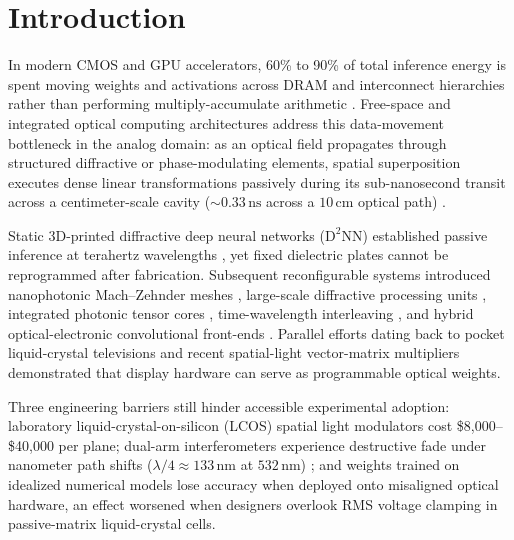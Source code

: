 \documentclass[journal]{IEEEtran}
\begin{document}
\section{Introduction}

In modern CMOS and GPU accelerators, 60\% to 90\% of total inference energy is spent moving weights and activations across DRAM and interconnect hierarchies rather than performing multiply-accumulate arithmetic \cite{horowitz2014computing,sze2017efficient}. Free-space and integrated optical computing architectures address this data-movement bottleneck in the analog domain: as an optical field propagates through structured diffractive or phase-modulating elements, spatial superposition executes dense linear transformations passively during its sub-nanosecond transit across a centimeter-scale cavity ($\sim 0.33\,\text{ns}$ across a $10\,\text{cm}$ optical path) \cite{wetzstein2020inference,psaltis1985optical,lin2018alloptical}.

Static 3D-printed diffractive deep neural networks ($\text{D}^2\text{NN}$) established passive inference at terahertz wavelengths \cite{lin2018alloptical}, yet fixed dielectric plates cannot be reprogrammed after fabrication. Subsequent reconfigurable systems introduced nanophotonic Mach--Zehnder meshes \cite{shen2017deep}, large-scale diffractive processing units \cite{zhou2021largescale}, integrated photonic tensor cores \cite{feldmann2021parallel}, time-wavelength interleaving \cite{xu2021tops}, and hybrid optical-electronic convolutional front-ends \cite{chang2018hybrid}. Parallel efforts dating back to pocket liquid-crystal televisions \cite{yu1990lctv} and recent spatial-light vector-matrix multipliers \cite{spall2020reconfigurable} demonstrated that display hardware can serve as programmable optical weights.

Three engineering barriers still hinder accessible experimental adoption: laboratory liquid-crystal-on-silicon (LCOS) spatial light modulators cost \$8,000--\$40,000 per plane; dual-arm interferometers experience destructive fade under nanometer path shifts ($\lambda/4 \approx 133\,\text{nm}$ at $532\,\text{nm}$) \cite{shen2017deep}; and weights trained on idealized numerical models lose accuracy when deployed onto misaligned optical hardware, an effect worsened when designers overlook RMS voltage clamping in passive-matrix liquid-crystal cells.
\end{document}
